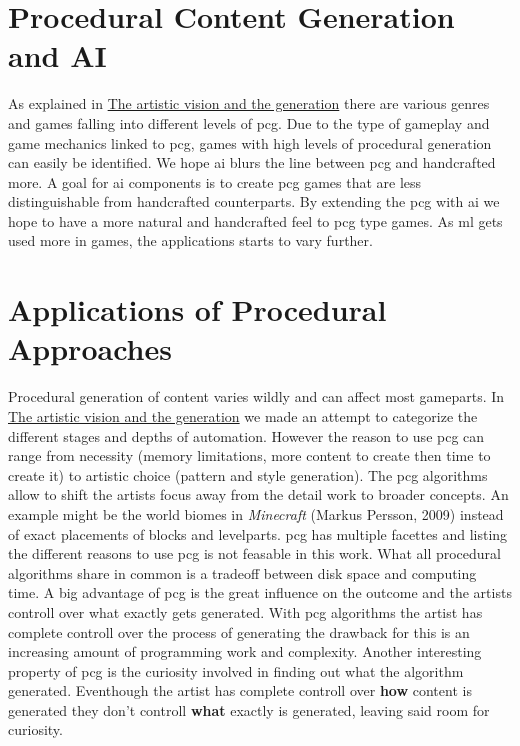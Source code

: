 \documentclass[10pt,a4paper]{article}
\begin{document}
\section{Procedural Content Generation and AI}
As explained in \hyperref[sec:visionVSgeneration]{The artistic vision and the generation} there are various genres and games falling into different levels of \gls{pcg}. Due to the type of gameplay and game mechanics linked to \gls{pcg}, games with high levels of procedural generation can easily be identified. We hope \gls{ai} blurs the line between \gls{pcg} and handcrafted more. A goal for \gls{ai} components is to create \gls{pcg} games that are less distinguishable from handcrafted counterparts. By extending the \gls{pcg} with \gls{ai} we hope to have a more natural and handcrafted feel to \gls{pcg} type games. As \gls{ml} gets used more in games, the applications starts to vary further.

\section{Applications of Procedural Approaches}
Procedural generation of content varies wildly and can affect most gameparts. In \hyperref[sec:visionVSgeneration]{The artistic vision and the generation} we made an attempt to categorize the different stages and depths of automation. However the reason to use \gls{pcg} can range from necessity (memory limitations, more content to create then time to create it) to artistic choice (pattern and style generation). The \gls{pcg} algorithms allow to shift the artists focus away from the detail work to broader concepts. An example might be the world biomes in \textit{Minecraft} (Markus Persson, 2009) instead of exact placements of blocks and levelparts. \gls{pcg} has multiple facettes and listing the different reasons to use \gls{pcg} is not feasable in this work. What all procedural algorithms share in common is a tradeoff between disk space and computing time. A big advantage of \gls{pcg} is the great influence on the outcome and the artists controll over what exactly gets generated. With \gls{pcg} algorithms the artist has complete controll over the process of generating the drawback for this is an increasing amount of programming work and complexity. Another interesting property of \gls{pcg} is the curiosity involved in finding out what the algorithm generated. Eventhough the artist has complete controll over \textbf{how} content is generated they don't controll \textbf{what} exactly is generated, leaving said room for curiosity.
\end{document}
